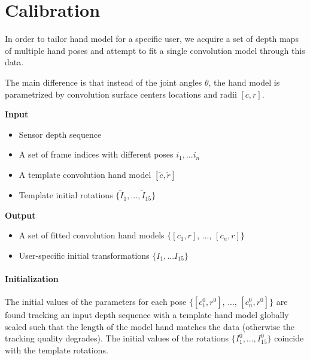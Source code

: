 \section{Calibration}
In order to tailor hand model for a specific user, we acquire a set of depth maps of multiple hand poses and attempt to fit a single convolution model through this data. 




The main difference is that instead of the joint angles $\theta$, the hand model is parametrized by convolution surface centers locations and radii $[c , r]$. 

\textbf{Input}
\begin{itemize}
\item Sensor depth sequence 
\item A set of frame indices with different poses $i_1, ... i_n$
\item A template convolution hand model $[\tilde{c} ,\tilde{r}]$ 
\item Template initial rotations $\{\tilde{I}_1, ..., \tilde{I}_{15}\}$
\end{itemize}

\textbf{Output}
\begin{itemize}
\item A set of fitted convolution hand models $\{[c_1 , r]$, ..., $[c_n , r]\}$
\item  User-specific initial transformations $\{I_1, ... I_{15}\}$
\end{itemize}

\paragraph{Initialization}
The initial values of the parameters for each pose  $\{[c^0_1 , r^0]$, ..., $[c^0_n, r^0]\}$ are found tracking an input depth sequence with a template hand model globally scaled such that the length of the model hand matches the data (otherwise the tracking quality degrades). The initial values of the rotations  $\{I^0_1, ..., I^0_{15}\}$ coincide with the template rotations.

